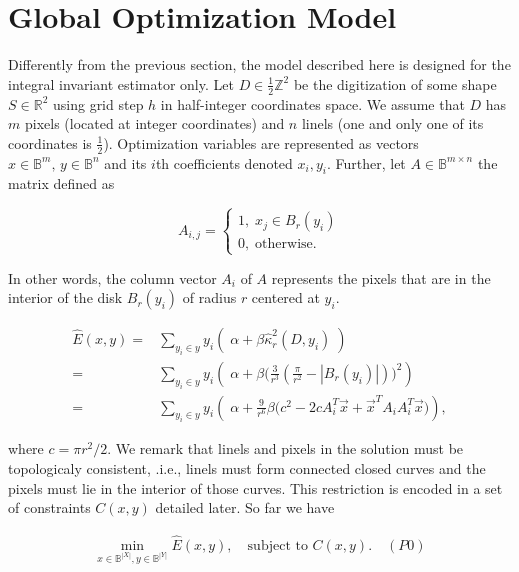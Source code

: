 \section{Global Optimization Model}\label{sec:global-optmization-model}

Differently from the previous section, the model described here is designed for the integral invariant estimator only. Let $D \in \frac{1}{2}\mathbb{Z}^2$ be the digitization of some shape $S \in \mathbb{R}^2$ using grid step $h$ in half-integer coordinates space. We assume that $D$ has $m$ pixels (located at integer coordinates) and $n$ linels (one and only one of its coordinates is $\frac{1}{2}$). Optimization variables are represented as vectors $x \in \mathbb{B}^{m},\, y \in \mathbb{B}^{n}$ and its $i$th coefficients denoted  $x_i,y_i$.  Further, let $A \in \mathbb{B}^{m\times n}$ the matrix defined as

\[
	A_{i,j} = \left\{ \begin{array}{ll}
		1,\; x_j \in B_{r}(y_i)\\
		0,\; \text{otherwise}.
	\end{array}\right.
\]

In other words, the column vector $A_i$ of $A$ represents the pixels that are in the interior of  the disk $B_{r}(y_i)$ of radius $r$ centered at $y_i$. 


\begin{align}
	\hat{E}(x,y) =& \sum_{y_i \in y}{ y_i \left(\; \alpha + \beta \hat{\kappa}_{r}^2(D,y_i) \; \right)}\\\nonumber
			   =& \sum_{y_i \in y}{ y_i \left(\; \alpha  + \beta \big( \frac{3}{r^3}(\frac{\pi}{r^2} - |B_r(y_i)|)\big)^2\right)}\\\nonumber
			   =& \sum_{y_i \in y}{ y_i \left(\; \alpha + \frac{9}{r^6}\beta \big(c^2 - 2cA_i^T\vec{x} + \vec{x}^TA_iA_i^T\vec{x}\big)\right)},			   
	\end{align}
	
where $c =  \pi r^2/2$. We remark that linels and pixels in the solution must be topologicaly consistent, .i.e., linels must form connected closed curves and the pixels must lie in the interior of those curves. This restriction is encoded in a set of constraints $C(x,y)$ detailed later. So far we have

\begin{align*}
	\min_{x \in \mathbb{B}^{|X|}, y \in \mathbb{B}^{|Y|}}{\hat{E}(x,y)}, \quad \text{subject to } C(x,y). \quad (P0)
\end{align*}

